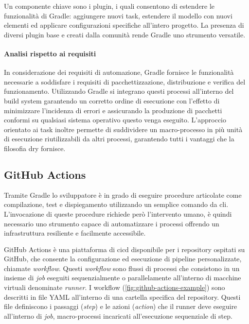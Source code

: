 Un componente chiave sono i plugin, i quali consentono di estendere le funzionalità di Gradle: aggiungere nuovi task, estendere il modello con nuovi elementi ed applicare configurazioni specifiche all'intero progetto. La presenza di diversi plugin base e creati dalla comunità rende Gradle uno strumento versatile.

\paragraph{Analisi rispetto ai requisiti}
In considerazione dei requisiti di automazione, Gradle fornisce le funzionalità necessarie a soddisfare i requisiti di pacchettizzazione, distribuzione e verifica del funzionamento. Utilizzando Gradle si integrano questi processi all'interno del build system garantendo un corretto ordine di esecuzione con l'effetto di minimizzare l'incidenza di errori e assicurando la produzione di pacchetti conformi su qualsiasi sistema operativo questo venga eseguito.
L'approccio orientato ai task inoltre permette di suddividere un macro-processo in più unità di esecuzione riutilizzabili da altri processi, garantendo tutti i vantaggi che la filosofia \ac{dry} fornisce.

\subsection{GitHub Actions}

Tramite Gradle lo sviluppatore è in grado di eseguire procedure articolate come compilazione, test e dispiegamento utilizzando un semplice comando da \ac{cli}. L'invocazione di queste procedure richiede però l'intervento umano, è quindi necessario uno strumento capace di automatizzare i processi offrendo un infrastruttura resiliente e facilmente accessibile.

GitHub Actions è una piattaforma di \ac{cicd} disponibile per i repository ospitati su GitHub, che consente la configurazione ed esecuzione di pipeline personalizzate, chiamate \textit{workflow}. Questi \textit{workflow} sono flussi di processi che consistono in un insieme di \textit{job} eseguiti sequenzialmente o parallelamente all'interno di macchine virtuali denominate \textit{runner}. I workflow (\cref{fig:github-actions-example}) sono descritti in file YAML all'interno di una cartella specifica del repository. Questi file definiscono i passaggi (\textit{step}) e le azioni (\textit{action}) che il runner deve eseguire all'interno di \textit{job}, macro-processi incaricati all'esecuzione sequenziale di step.

